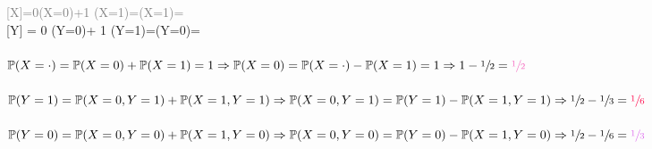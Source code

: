 \documentclass[a4paper]{article}
\begin{document}
\textcolor{gray}{[X]=0\cdot {}(X=0)+1 \cdot {}(X=1)=(X=1)=}\\
[Y] = 0 \cdot {}(Y=0)+ 1 \cdot {}(Y=1)=(Y=0)=\textcolor[HTML]{B176FA}{}\)\\\\
\(\mathbb{P}(X=\cdot)=\mathbb{P}(X=0)+\mathbb{P}(X=1)=1 \Rightarrow \mathbb{P}(X=0)=\mathbb{P}(X=\cdot)-\mathbb{P}(X=1)=1 \Rightarrow 1- \sfrac{1}{2} = \textcolor[HTML]{F56BC1}{\sfrac{1}{2}}\)\\\\
\(\mathbb{P}(Y=1)= \mathbb{P}(X=0,Y=1)+\mathbb{P}(X=1,Y=1) \Rightarrow \mathbb{P}(X=0,Y=1)=\mathbb{P}(Y=1)-\mathbb{P}(X=1,Y=1)  \Rightarrow \sfrac{1}{2}-\sfrac{1}{3}= \textcolor[HTML]{FF0046}{\sfrac{1}{6}}\)\\\\
\(\mathbb{P}(Y=0)= \mathbb{P}(X=0,Y=0)+\mathbb{P}(X=1,Y=0) \Rightarrow \mathbb{P}(X=0,Y=0)=\mathbb{P}(Y=0)-\mathbb{P}(X=1,Y=0)  \Rightarrow \sfrac{1}{2}-\sfrac{1}{6}= \textcolor[HTML]{DD6BED}{\sfrac{1}{3}}\)
\end{document}
